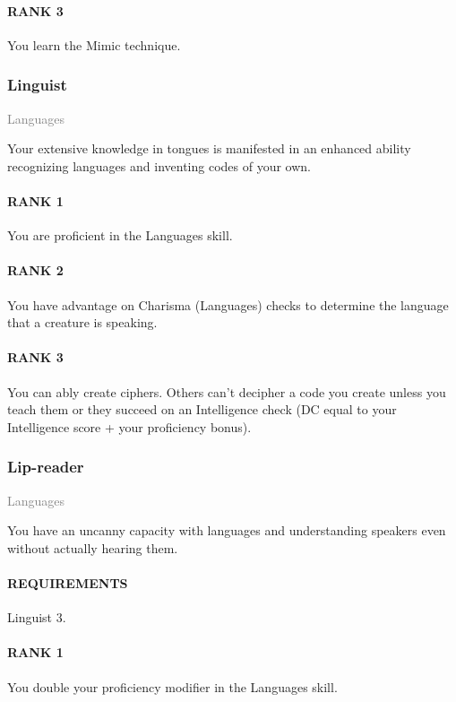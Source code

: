 \paragraph{RANK 3} You learn the Mimic technique.

\subsubsection{Linguist} \label{feat::linguist}
\small{\textcolor{gray}{Languages}}

\normalsize
Your extensive knowledge in tongues is manifested in an enhanced ability recognizing languages and inventing codes of your own.
\paragraph{RANK 1} You are proficient in the Languages skill.
\paragraph{RANK 2} You have advantage on Charisma (Languages) checks to determine the language that a creature is speaking.
\paragraph{RANK 3} You can ably create ciphers.
Others can't decipher a code you create unless you teach them or they succeed on an Intelligence check (DC equal to your Intelligence score + your proficiency bonus).

\subsubsection{Lip-reader} \label{feat::lipreader}
\small{\textcolor{gray}{Languages}}

\normalsize
You have an uncanny capacity with languages and understanding speakers even without actually hearing them.
\paragraph{REQUIREMENTS} Linguist 3.
\paragraph{RANK 1} You double your proficiency modifier in the Languages skill.
